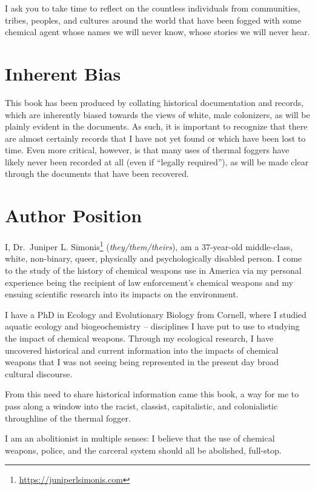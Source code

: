 \documentclass[
  11pt,
]{krantz}
\renewcommand{\href}[2]{#2\footnote{\url{#1}}}
\begin{document}
I ask you to take time to reflect on the countless individuals from communities, tribes, peoples, and cultures around the world that have been fogged with some chemical agent whose names we will never know, whose stories we will never hear.

\hypertarget{inherent-bias}{%
\section*{Inherent Bias}\label{inherent-bias}}


This book has been produced by collating historical documentation and records, which are inherently biased towards the views of white, male colonizers, as will be plainly evident in the documents.
As such, it is important to recognize that there are almost certainly records that I have not yet found or which have been lost to time.
Even more critical, however, is that many uses of thermal foggers have likely never been recorded at all (even if ``legally required''), as will be made clear through the documents that have been recovered.

\hypertarget{author-position}{%
\section*{Author Position}\label{author-position}}


I, \href{https://juniperlsimonis.com}{Dr.~Juniper L. Simonis} (\emph{they/them/theirs}), am a 37-year-old middle-class, white, non-binary, queer, physically and psychologically disabled person.
I come to the study of the history of chemical weapons use in America via my personal experience being the recipient of law enforcement's chemical weapons and my ensuing scientific research into its impacts on the environment.

I have a PhD in Ecology and Evolutionary Biology from Cornell, where I studied aquatic ecology and biogeochemistry -- disciplines I have put to use to studying the impact of chemical weapons.
Through my ecological research, I have uncovered historical and current information into the impacts of chemical weapons that I was not seeing being represented in the present day broad cultural discourse.

From this need to share historical information came this book, a way for me to pass along a window into the racist, classist, capitalistic, and colonialistic throughline of the thermal fogger.

I am an abolitionist in multiple senses: I believe that the use of chemical weapons, police, and the carceral system should all be abolished, full-stop.
\end{document}
